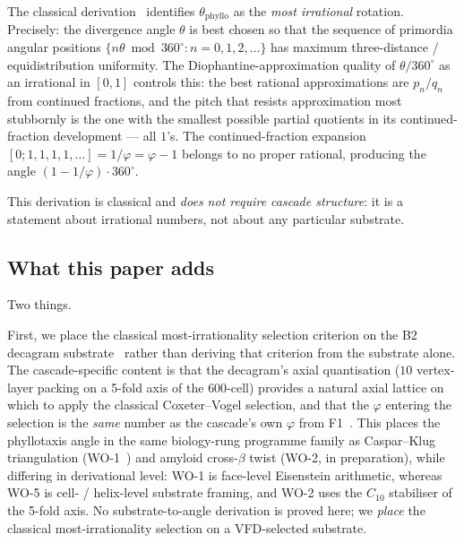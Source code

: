 \documentclass[12pt]{article}
\newcommand{\phig}{\varphi}
\begin{document}
The classical derivation~\cite{Coxeter1953,Vogel1979} identifies
$\theta_{\mathrm{phyllo}}$ as the \emph{most irrational} rotation.
Precisely: the divergence angle $\theta$ is best chosen so that the
sequence of primordia angular positions $\{n\theta \bmod 360^{\circ} :
n = 0, 1, 2, \ldots\}$ has maximum three-distance / equidistribution
uniformity. The Diophantine-approximation quality of $\theta /
360^{\circ}$ as an irrational in $[0, 1]$ controls this: the best
rational approximations are $p_n/q_n$ from continued fractions, and
the pitch that resists approximation most stubbornly is the one with
the smallest possible partial quotients in its continued-fraction
development --- all $1$'s. The continued-fraction expansion
$[0; 1, 1, 1, 1, \ldots] = 1/\phig = \phig - 1$ belongs to no proper
rational, producing the angle $(1 - 1/\phig) \cdot 360^{\circ}$.

This derivation is classical and \emph{does not require cascade
structure}: it is a statement about irrational numbers, not about
any particular substrate.

\subsection{What this paper adds}

Two things.

First, we place the classical most-irrationality selection
criterion on the B2 decagram substrate~\cite[\S5.1]{CascadeBio}
rather than deriving that criterion from the substrate alone.
The cascade-specific content is that the decagram's axial
quantisation ($10$ vertex-layer packing on a 5-fold axis of the
$600$-cell) provides a natural axial lattice on which to apply
the classical Coxeter--Vogel selection, and that the $\phig$
entering the selection is the \emph{same} number as the cascade's
own $\phig$ from F1~\cite[\S F1]{CascadeFoundations}. This
places the phyllotaxis angle in the same biology-rung programme
family as Caspar--Klug triangulation (WO-1~\cite{SmartCapsid})
and amyloid cross-$\beta$ twist (WO-2, in preparation), while
differing in derivational level: WO-1 is face-level Eisenstein
arithmetic, whereas WO-5 is cell- / helix-level substrate
framing, and WO-2 uses the $C_{10}$ stabiliser of the 5-fold
axis. No substrate-to-angle derivation is proved here; we
\emph{place} the classical most-irrationality selection on a
VFD-selected substrate.
\end{document}
